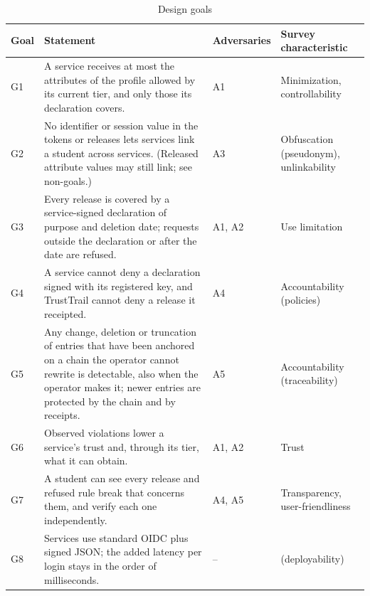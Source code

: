 \begin{table}[t]
\centering
\caption{Design goals}
\label{tab:goals}
\small
\begin{tabularx}{\linewidth}{@{}l >{\raggedright\arraybackslash}X >{\raggedright\arraybackslash}p{1.8cm} >{\raggedright\arraybackslash}p{3.6cm}@{}}
\toprule
Goal & Statement & Adversaries & Survey characteristic \\
\midrule
G1 & A service receives at most the attributes of the profile allowed by its current tier, and only those its declaration covers. & A1 & Minimization, controllability \\
G2 & No identifier or session value in the tokens or releases lets services link a student across services. (Released attribute values may still link; see non-goals.) & A3 & Obfuscation (pseudonym), unlinkability \\
G3 & Every release is covered by a service-signed declaration of purpose and deletion date; requests outside the declaration or after the date are refused. & A1, A2 & Use limitation \\
G4 & A service cannot deny a declaration signed with its registered key, and TrustTrail cannot deny a release it receipted. & A4 & Accountability (policies) \\
G5 & Any change, deletion or truncation of entries that have been anchored on a chain the operator cannot rewrite is detectable, also when the operator makes it; newer entries are protected by the chain and by receipts. & A5 & Accountability (traceability) \\
G6 & Observed violations lower a service's trust and, through its tier, what it can obtain. & A1, A2 & Trust \\
G7 & A student can see every release and refused rule break that concerns them, and verify each one independently. & A4, A5 & Transparency, user-friendliness \\
G8 & Services use standard OIDC plus signed JSON; the added latency per login stays in the order of milliseconds. & -- & (deployability) \\
\bottomrule
\end{tabularx}
\end{table}

